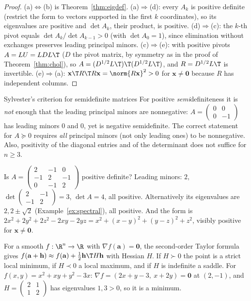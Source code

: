 \begin{proof}
(a)$\Leftrightarrow$(b) is Theorem~\ref{thm:eigdef}. (a)$\Rightarrow$(d): every $A_k$ is positive definite (restrict the form to vectors supported in the first $k$ coordinates), so its eigenvalues are positive and $\det A_k$, their product, is positive. (d)$\Rightarrow$(c): the $k$-th pivot equals $\det A_k/\det A_{k-1}>0$ (with $\det A_0=1$), since elimination without exchanges preserves leading principal minors. (c)$\Rightarrow$(e): with positive pivots $A=LU=LDL\T$ ($D$ the pivot matrix, by symmetry as in the proof of Theorem~\ref{thm:chol}), so $A=(D^{1/2}L\T)\T(D^{1/2}L\T)$, and $R=D^{1/2}L\T$ is invertible. (e)$\Rightarrow$(a): $\mathbf{x}\T R\T R\mathbf{x}=\norm{R\mathbf{x}}^2>0$ for $\mathbf{x}\ne\mathbf{0}$ because $R$ has independent columns.
\end{proof}

\begin{pitfall}{Sylvester's criterion for semidefinite matrices}
For positive \emph{semi}definiteness it is \emph{not} enough that the leading principal minors are nonnegative: $A=\begin{pmatrix}0&0\\0&-1\end{pmatrix}$ has leading minors $0$ and $0$, yet is negative semidefinite. The correct statement for $A\succeq0$ requires \emph{all} principal minors (not only leading ones) to be nonnegative. Also, positivity of the diagonal entries and of the determinant does not suffice for $n\ge3$.
\end{pitfall}

\begin{example}
Is $A=\begin{pmatrix}2&-1&0\\-1&2&-1\\0&-1&2\end{pmatrix}$ positive definite? Leading minors: $2$, $\det\begin{pmatrix}2&-1\\-1&2\end{pmatrix}=3$, $\det A=4$, all positive. Alternatively its eigenvalues are $2,2\pm\sqrt2$ (Example~\ref{ex:spectral}), all positive. And the form is $2x^2+2y^2+2z^2-2xy-2yz=x^2+(x-y)^2+(y-z)^2+z^2$, visibly positive for $\mathbf{x}\ne\mathbf{0}$.
\end{example}

\begin{example}
For a smooth $f:\R^n\to\R$ with $\nabla f(\mathbf{a})=\mathbf{0}$, the second-order Taylor formula gives $f(\mathbf{a}+\mathbf{h})\approx f(\mathbf{a})+\tfrac12\mathbf{h}\T H\mathbf{h}$ with Hessian $H$. If $H\succ0$ the point is a strict local minimum, if $H\prec0$ a local maximum, and if $H$ is indefinite a saddle. For $f(x,y)=x^2+xy+y^2-3x$: $\nabla f=(2x+y-3,\ x+2y)=\mathbf{0}$ at $(2,-1)$, and $H=\begin{pmatrix}2&1\\1&2\end{pmatrix}$ has eigenvalues $1,3>0$, so it is a minimum.
\end{example}

